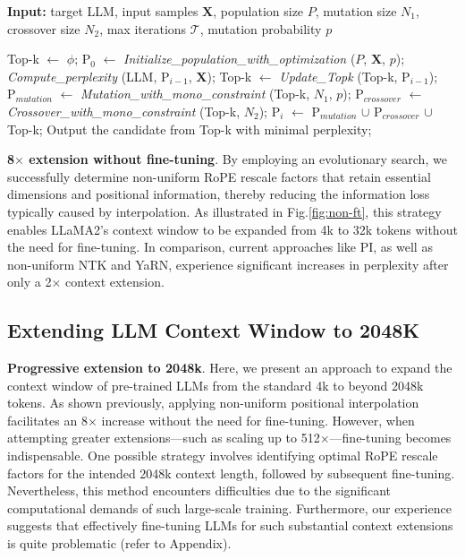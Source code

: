 \begin{algorithm}[t]
	\small
	\caption{The search algorithm}
	\textbf{Input:} target LLM, input samples $\mathbf{X}$, population size $P$, mutation size $N_1$, crossover size $N_2$, max iterations $\mathcal{T}$, mutation probability $p$\\

	\begin{algorithmic}[1]
		\label{alg:search}
		\STATE Top-k $\gets$ $\phi$;	
		\STATE $\text{P}_0$ $\gets$ \textit{Initialize\_population\_with\_optimization} ($P$, $\mathbf{X}$, $p$); 
		\STATE \textit{Compute\_perplexity} (LLM, $\text{P}_{i-1}$, $\mathbf{X}$);
		\STATE Top-k $\gets$ \textit{Update\_Topk} (Top-k, $\text{P}_{i-1}$);
		\STATE $\text{P}_{mutation}$ $\gets$ \textit{Mutation\_with\_mono\_constraint} (Top-k, $N_1$, $p$); 
		\STATE $\text{P}_{crossover}$ $\gets$ \textit{Crossover\_with\_mono\_constraint} (Top-k, $N_2$);
		\STATE $\text{P}_i$ $\gets$ $\text{P}_{mutation}$ $\cup$ $\text{P}_{crossover}$ $\cup$ Top-k;
		\ENDFOR
		\STATE Output the candidate from Top-k with minimal perplexity;
	\end{algorithmic}
\end{algorithm}

\textbf{8$\times$ extension without fine-tuning}. By employing an evolutionary search, we successfully determine non-uniform RoPE rescale factors that retain essential dimensions and positional information, thereby reducing the information loss typically caused by interpolation. As illustrated in Fig.\ref{fig:non-ft}, this strategy enables LLaMA2's context window to be expanded from 4k to 32k tokens without the need for fine-tuning. In comparison, current approaches like PI, as well as non-uniform NTK and YaRN, experience significant increases in perplexity after only a 2$\times$ context extension.

\subsection{Extending LLM Context Window to 2048K}
\label{sec:extendto2048k}

\textbf{Progressive extension to 2048k}. Here, we present an approach to expand the context window of pre-trained LLMs from the standard 4k to beyond 2048k tokens. As shown previously, applying non-uniform positional interpolation facilitates an 8$\times$ increase without the need for fine-tuning. However, when attempting greater extensions—such as scaling up to 512$\times$—fine-tuning becomes indispensable. One possible strategy involves identifying optimal RoPE rescale factors for the intended 2048k context length, followed by subsequent fine-tuning. Nevertheless, this method encounters difficulties due to the significant computational demands of such large-scale training. Furthermore, our experience suggests that effectively fine-tuning LLMs for such substantial context extensions is quite problematic (refer to Appendix).

